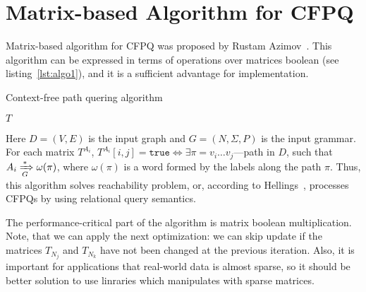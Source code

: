 \section{Matrix-based Algorithm for CFPQ}

Matrix-based algorithm for CFPQ was proposed by Rustam Azimov~\cite{Azimov:2018:CPQ:3210259.3210264}.
This algorithm can be expressed in terms of operations over matrices boolean (see listing~\ref{lst:algo1}), and it is a sufficient advantage for implementation.

\begin{algorithm}
\begin{algorithmic}[1]
\caption{Context-free path quering algorithm}
\label{lst:algo1}

        \EndFor
    \EndFor
        \EndFor
    \EndWhile
\State \Return $T$
\EndFunction
\end{algorithmic}
\end{algorithm}

Here $D = (V, E)$ is the input graph and $G = (N,\Sigma,P)$ is the input grammar.
For each matrix $T^{A_i}$, $T^{A_i}[i,j] = \texttt{true} \iff \exists \pi = v_i \ldots v_j $---path in $D$, such that $A_i \xRightarrow[G]{*} \omega(\pi) $, where $\omega(\pi)$ is a word formed by the labels along the path $\pi$.
Thus, this algorithm solves reachability problem, or, according to Hellings~\cite{hellingsRelational}, processes CFPQs by using relational query semantics.

The performance-critical part of the algorithm is matrix boolean multiplication.
Note, that we can apply the next optimization: we can skip update if the matrices $T_{N_j}$ and $T_{N_k}$ have not been changed at the previous iteration.
Also, it is important for applications that real-world data is almost sparse, so it should be better solution to use linraries which manipulates with sparse matrices.

